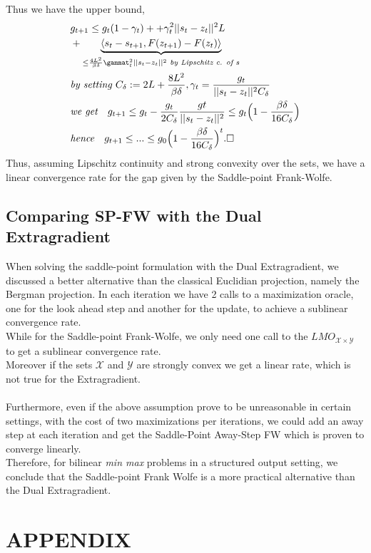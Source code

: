 \documentclass{article}
\begin{document}
Thus we have the upper bound,
\begin{equation*}
\begin{aligned}
    &g_{t+1}\leq g_{t}(1-\gamma_{t})+ + \gamma_{t}^{2}||s_{t}-z_{t}||^{2}L\\
    &+ \underbrace{\langle s_{t}- s_{t+1}, F(z_{t+1})- F(z_{t})\rangle}_{\leq \frac{4L^{2}}{\beta\delta}\gammat_{t}^{2}||s_{t}- z_{t}||^{2}\textit{ by Lipschitz c. of $s$}}\\
    &\textit{by setting } C_{\delta}:= 2L+ \frac{8L^{2}}{\beta\delta}, \gamma_{t}=\frac{g_{t}}{||s_{t}-z_{t}||^{2}C_{\delta}}\\
    &\textit{we get}\quad g_{t+1}\leq g_{t}- \frac{g_{t}}{2C_{\delta}}\frac{g{t}}{||s_{t}-z_{t}||^{2}}\leq g_{t}\Big(1-\frac{\beta\delta}{16C_{\delta}}\Big)\\
    &\textit{hence}\quad g_{t+1}\leq ...\leq g_{0}\Big(1-\frac{\beta\delta}{16C_{\delta}}\Big)^{t}.\Box
\end{aligned}
\end{equation*}
Thus, assuming Lipschitz continuity and strong convexity over the sets, we have a linear convergence rate for the gap given by the Saddle-point Frank-Wolfe.
\subsection{Comparing SP-FW with the Dual Extragradient}
When solving the saddle-point formulation with the Dual Extragradient, we discussed a better alternative than the classical Euclidian projection, namely the Bergman projection. In each iteration we have 2 calls to a maximization oracle, one for the look ahead step and another for the update, to achieve a sublinear convergence rate.\\
While for the Saddle-point Frank-Wolfe, we only need one call to the $LMO_{\mathcal{X}\times\mathcal{Y}}$ to get a sublinear convergence rate.\\
Moreover if the sets $\mathcal{X}$ and $\mathcal{Y}$ are strongly convex we get a linear rate, which is not true for the Extragradient.\\
\\
Furthermore, even if the above assumption prove to be unreasonable in certain settings, with the cost of two maximizations per iterations, we could add an away step at each iteration and get the Saddle-Point Away-Step FW which is proven to converge linearly.\\
Therefore, for bilinear \textit{min max} problems in a structured output setting, we conclude that the Saddle-point Frank Wolfe is a more practical alternative than the Dual Extragradient.

\newpage
\section*{APPENDIX}
\end{document}
